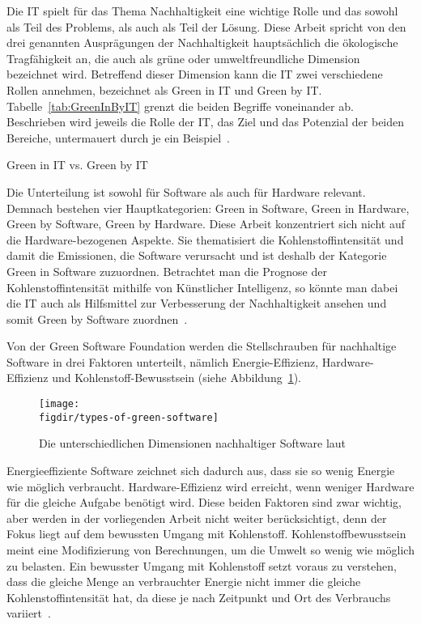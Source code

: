 Die \ac{IT} spielt für das Thema Nachhaltigkeit eine wichtige Rolle und das sowohl als Teil des Problems, als auch als Teil der Lösung.
Diese Arbeit spricht von den drei genannten Ausprägungen der Nachhaltigkeit hauptsächlich die ökologische Tragfähigkeit an, die auch als \glqq grüne\grqq{} oder \glqq umweltfreundliche\grqq{} Dimension bezeichnet wird.
Betreffend dieser Dimension kann die \ac{IT} zwei verschiedene Rollen annehmen, bezeichnet als Green in \ac{IT} und Green by \ac{IT}\@.
Tabelle~\ref{tab:GreenInByIT} grenzt die beiden Begriffe voneinander ab.
Beschrieben wird jeweils die Rolle der \ac{IT}, das Ziel und das Potenzial der beiden Bereiche, untermauert durch je ein Beispiel~\cite{Calero.2015}.

\begin{table}[t]
 \centering\small
 \caption{Green in IT vs. Green by IT}
 \label{tab:GreenInByIT}
 
\end{table}

Die Unterteilung ist sowohl für Software als auch für Hardware relevant.
Demnach bestehen vier Hauptkategorien:
Green in Software, Green in Hardware, Green by Software, Green by Hardware.
Diese Arbeit konzentriert sich nicht auf die Hardware-bezogenen Aspekte.
Sie thematisiert die Kohlenstoffintensität und damit die Emissionen, die Software verursacht und ist deshalb der Kategorie Green in Software zuzuordnen.
Betrachtet man die Prognose der Kohlenstoffintensität mithilfe von Künstlicher Intelligenz, so könnte man dabei die \ac{IT} auch als Hilfsmittel zur Verbesserung der Nachhaltigkeit ansehen und somit Green by Software zuordnen~\cite{Calero.2015}.

Von der Green Software Foundation werden die Stellschrauben für nachhaltige Software in drei Faktoren unterteilt, nämlich Energie-Effizienz, Hardware-Effizienz und Kohlenstoff-Bewusstsein (siehe Abbildung~\ref{FIG:types-green-software}).
\begin{figure}
 \caption{Die unterschiedlichen Dimensionen nachhaltiger Software laut~\cite{GreenSoftwareFoundation.20240316T16:54:58.000Z}}
 {\texttt{[image: \\figdir/types-of-green-software]}}
 \label{FIG:types-green-software}
\end{figure}
Energieeffiziente Software zeichnet sich dadurch aus, dass sie so wenig Energie wie möglich verbraucht.
Hardware-Effizienz wird erreicht, wenn weniger Hardware für die gleiche Aufgabe benötigt wird.
Diese beiden Faktoren sind zwar wichtig, aber werden in der vorliegenden Arbeit nicht weiter berücksichtigt, denn der Fokus liegt auf dem bewussten Umgang mit Kohlenstoff.
Kohlenstoffbewusstsein meint eine Modifizierung von Berechnungen, um die Umwelt so wenig wie möglich zu belasten.
Ein bewusster Umgang mit Kohlenstoff setzt voraus zu verstehen, dass die gleiche Menge an verbrauchter Energie nicht immer die gleiche Kohlenstoffintensität hat, da diese je nach Zeitpunkt und Ort des Verbrauchs variiert~\cite{GreenSoftwareFoundation.2022}.

